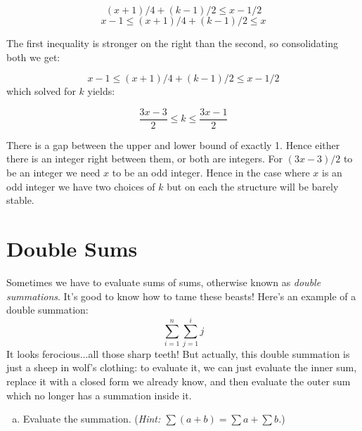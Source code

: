 \documentclass[12pt]{article}
\begin{document}
{$$(x + 1)/4 + (k-1)/2 \leq  x - 1/2$$
$$ x - 1 \leq (x+1)/4 + (k-1)/2 \leq x$$

The first inequality is stronger on the right than the second, so consolidating both we get:

$$ x - 1 \leq  (x+1)/4 + (k-1)/2 \leq x - 1/2$$ which solved for $k$ yields:

$$\dfrac{3x - 3}{2} \leq k \leq \dfrac{3x- 1}{2}$$

There is a gap between the upper and lower bound of exactly 1. Hence either there is an integer right between them, or both are integers. For $(3x-3)/2$ to be an integer we need $x$ to be an odd integer.  Hence in the case where $x$ is an odd integer we have two choices of $k$ but on each the structure will be barely stable.

}
\newpage

\section{Double Sums}

Sometimes we have to evaluate sums of sums, otherwise known as
\emph{double summations}. It's good to know how to tame these beasts!
Here's an example of a double summation:
\[
\sum_{i=1}^n \sum_{j=1}^i j
\]
It looks ferocious...all those sharp teeth! But actually, this double
summation is just a sheep in wolf's clothing: to evaluate it, we can
just evaluate the inner sum, replace it with a closed form we already
know, and then evaluate the outer sum which no longer has a summation
inside it.

\begin{enumerate}[(a)]
\item Evaluate the summation. (\textit{Hint: $\sum(a+b)=\sum a + \sum b$.})

\end{enumerate}
\end{document}
